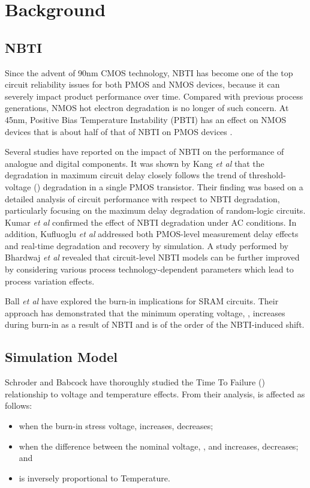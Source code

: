 \documentclass[11pt,a4paper]{article}
\begin{document}
\section{Background}
\subsection{NBTI}
Since the advent of 90nm CMOS technology, NBTI has become  one of the top circuit reliability issues for both PMOS and NMOS devices, because it can severely impact product performance over time. Compared with previous process generations, NMOS hot electron degradation is no longer of such concern. At 45nm, Positive Bias Temperature Instability (PBTI) has an effect on NMOS devices that is about half of that of NBTI on PMOS devices \cite{khan}. 

Several studies have reported on the impact of NBTI on the performance of analogue and digital components.
It was shown by Kang \textit{et al} \cite{Roy} that the degradation in maximum circuit delay closely follows the trend of threshold-voltage () degradation  in a single PMOS transistor. Their finding was based on a detailed analysis of circuit performance with respect to NBTI degradation, particularly focusing on the maximum delay degradation of random-logic circuits. Kumar \textit{et al} \cite{Sapatnekar} confirmed the effect of NBTI degradation under AC conditions. In addition, Kufluoglu \textit{et al} \cite{Kufluoglu} addressed both PMOS-level measurement delay effects and real-time degradation and recovery by simulation. 
A study performed by Bhardwaj \textit{et al} \cite{Cao} revealed that circuit-level NBTI models can be further improved by considering various process technology-dependent parameters which lead to process variation effects.

 Ball \textit{et al} \cite{Krishnan} have explored the burn-in implications for SRAM circuits. Their approach has demonstrated that the minimum operating voltage, ,  increases during burn-in as a result of NBTI and is of the order of the NBTI-induced   shift.

\subsection{Simulation Model}
Schroder and Babcock \cite{Schroder} have thoroughly studied the Time To Failure () relationship to voltage and temperature effects. From their analysis,  is affected as follows:

\begin{itemize}\itemsep0pt
\item when the burn-in stress voltage,  increases,  decreases;

\item when the difference between the nominal voltage, , and  increases,  decreases; and

\item  is inversely proportional to Temperature.
\end{itemize}
\end{document}
